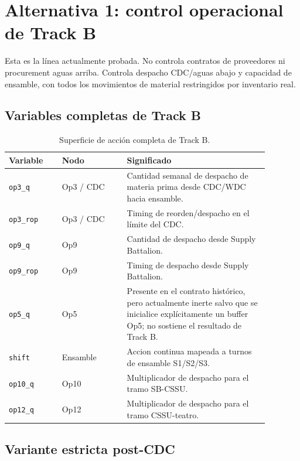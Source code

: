 \documentclass[11pt]{article}
\begin{document}
\section*{Alternativa 1: control operacional de Track B}

Esta es la línea actualmente probada. No controla contratos de proveedores ni
procurement aguas arriba. Controla despacho CDC/aguas abajo y capacidad de
ensamble, con todos los movimientos de material restringidos por inventario
real.

\subsection*{Variables completas de Track B}

\begin{table}[ht]
\centering
\small
\begin{tabular}{p{0.18\linewidth}p{0.22\linewidth}p{0.48\linewidth}}
\toprule
\textbf{Variable} & \textbf{Nodo} & \textbf{Significado} \\
\midrule
\texttt{op3\_q} & Op3 / CDC & Cantidad semanal de despacho de materia prima desde CDC/WDC hacia ensamble. \\
\texttt{op3\_rop} & Op3 / CDC & Timing de reorden/despacho en el límite del CDC. \\
\texttt{op9\_q} & Op9 & Cantidad de despacho desde Supply Battalion. \\
\texttt{op9\_rop} & Op9 & Timing de despacho desde Supply Battalion. \\
\texttt{op5\_q} & Op5 & Presente en el contrato histórico, pero actualmente inerte salvo que se inicialice explícitamente un buffer Op5; no sostiene el resultado de Track B. \\
\texttt{shift} & Ensamble & Accion continua mapeada a turnos de ensamble S1/S2/S3. \\
\texttt{op10\_q} & Op10 & Multiplicador de despacho para el tramo SB-CSSU. \\
\texttt{op12\_q} & Op12 & Multiplicador de despacho para el tramo CSSU-teatro. \\
\bottomrule
\end{tabular}
\caption{Superficie de acción completa de Track B.}
\end{table}

\subsection*{Variante estricta post-CDC}
\end{document}
